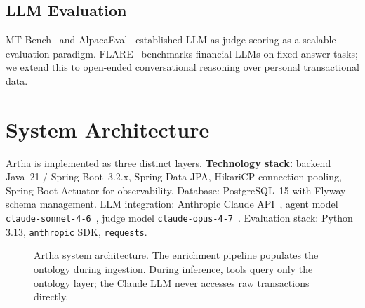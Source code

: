 \documentclass[conference]{IEEEtran}
\begin{document}
\subsection{LLM Evaluation}

MT-Bench~\cite{mtbench} and AlpacaEval~\cite{alpacaeval}
established LLM-as-judge scoring as a scalable evaluation paradigm.
FLARE~\cite{flare} benchmarks financial LLMs on fixed-answer tasks;
we extend this to open-ended conversational reasoning over personal
transactional data.

\section{System Architecture}

Artha is implemented as three distinct layers. \textbf{Technology
stack:} backend Java~21 / Spring Boot~3.2.x, Spring Data JPA,
HikariCP connection pooling, Spring Boot Actuator for observability.
Database: PostgreSQL~15 with Flyway schema management. LLM
integration: Anthropic Claude API~\cite{anthropic_api}, agent model
\texttt{claude-sonnet-4-6}~\cite{claude_sonnet}, judge model
\texttt{claude-opus-4-7}~\cite{claude_opus}. Evaluation stack:
Python 3.13, \texttt{anthropic} SDK, \texttt{requests}.

\begin{figure}[t]
\centering
{}
\caption{Artha system architecture. The enrichment pipeline
populates the ontology during ingestion. During inference, tools
query only the ontology layer; the Claude LLM never accesses raw
transactions directly.}
\label{fig:arch}
\end{figure}
\end{document}
